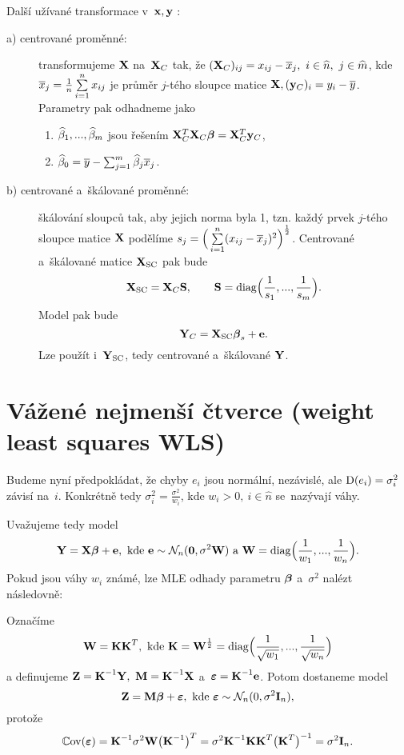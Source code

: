 \begin{remark}
	Další užívané transformace v~$\mathbf{x},\mathbf{y}$ :
	\begin{description}
	\item[a) centrované proměnné:] transformujeme $\mathbf{X}$ na~$\mathbf{X}_C$ tak, že $(\mathbf{X}_C)_{ij} = x_{ij}-\overline{x}_j,~i\in\widehat{n},~j\in\widehat{m}$, kde $\overline{x}_j = \frac{1}{n}\sum\limits_{i=1}^{n} x_{ij}$ je průměr $j$-tého sloupce matice $\mathbf{X}, (\mathbf{y}_C)_i = y_i-\overline{y}$. Parametry pak odhadneme jako
	\begin{enumerate}[1)]
		\item $\widehat{\beta}_1, ..., \widehat{\beta}_m$ jsou řešením $\mathbf{X}_C^T \mathbf{X}_C \boldsymbol{\beta} = \mathbf{X}_C^T \mathbf{y}_C$,
		\item $\widehat{\beta}_0 = \overline{y} - \sum_{j=1}^m \widehat{\beta}_j \overline{x}_j$.
	\end{enumerate}
	\item[b) centrované a~škálované proměnné:] škálování sloupců tak, aby jejich norma byla 1, tzn. každý prvek $j$-tého sloupce matice $\mathbf{X}$ podělíme $s_j = \Big(\sum\limits_{i=1}^{n} (x_{ij}-\overline{x}_j)^2\Big)^{\frac{1}{2}}$. Centrované a~škálované matice $\mathbf{X}_\mathrm{SC}$ pak bude
	 $$
	\mathbf{X}_\mathrm{SC} = \mathbf{X}_C\textbf{S},\qquad \textbf{S} = \mathrm{diag}\Big(\frac{1}{s_1},...,\frac{1}{s_m}\Big).
	 $$
	Model pak bude
	 $$
	\mathbf{Y}_C = \mathbf{X}_\mathrm{SC}\boldsymbol{\beta}_s+\mathbf{e}. $$ Lze použít i~$\mathbf{Y}_\mathrm{SC}$, tedy centrované a~škálované $\mathbf{Y}$.
	\end{description}
\end{remark}

\section{Vážené nejmenší čtverce (weight least squares WLS)}
Budeme nyní předpokládat, že chyby $e_i$ jsou normální, nezávislé, ale $\mathrm{D}(e_i) = \sigma_i^2$ závisí na~$i$. Konkrétně tedy $\sigma_i^2 = \frac{\sigma^2}{w_i}$, kde $w_i>0,~i\in\widehat{n}$ se~nazývají váhy.

Uvažujeme tedy model
\begin{equation}\label{rovnickaW}
\mathbf{Y} = \mathbf{X}\boldsymbol{\beta}+\mathbf{e},\text{ kde }\mathbf{e}\sim\mathcal{N}_n(\boldsymbol{0},\sigma^2\textbf{W})\text{ a~}\textbf{W} = \mathrm{diag}\Big(\frac{1}{w_1},...,\frac{1}{w_n}\Big).
\end{equation}
Pokud jsou váhy $w_i$ známé, lze MLE odhady parametru $\boldsymbol{\beta}$ a~$\sigma^2$ nalézt následovně:

Označíme
 $$
\textbf{W} = \textbf{K} \textbf{K}^T,\text{ kde }\textbf{K} = \textbf{W}^{\frac{1}{2}} = \mathrm{diag}\Big(\frac{1}{\sqrt{w_1}},...,\frac{1}{\sqrt{w_n}}\Big)
 $$
a definujeme $\textbf{Z} = {\textbf{K}^{-1}}\mathbf{Y},~\textbf{M} = {\textbf{K}^{-1}}\mathbf{X}$ a~$\boldsymbol{\varepsilon} = {\textbf{K}^{-1}}\mathbf{e}$. Potom dostaneme model
\begin{equation}\label{rovnickaW2}
\textbf{Z} = \textbf{M}\boldsymbol{\beta}+\boldsymbol{\varepsilon},\text{ kde }\boldsymbol{\varepsilon}\sim\mathcal{N}_n(0,\sigma^2 \textbf{I}_{n}),
\end{equation}
protože
 $$
\mathbb{C}\mathrm{ov}(\boldsymbol{\varepsilon}) = {\textbf{K}^{-1}}\sigma^2\textbf{W}\big({\textbf{K}^{-1}}\big)^T = \sigma^2 {\textbf{K}^{-1}}\textbf{K}\textbf{K}^T\big(\textbf{K}^T\big)^{-1} = \sigma^2 \textbf{I}_{n}.
 $$

